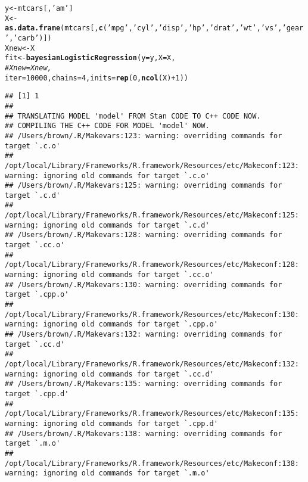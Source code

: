 \documentclass{article}\usepackage[]{graphicx}\usepackage[]{color}
\makeatletter
\newcommand{\hlnum}[1]{\textcolor[rgb]{0.686,0.059,0.569}{#1}}%
\newcommand{\hlstr}[1]{\textcolor[rgb]{0.192,0.494,0.8}{#1}}%
\newcommand{\hlcom}[1]{\textcolor[rgb]{0.678,0.584,0.686}{\textit{#1}}}%
\newcommand{\hlopt}[1]{\textcolor[rgb]{0,0,0}{#1}}%
\newcommand{\hlstd}[1]{\textcolor[rgb]{0.345,0.345,0.345}{#1}}%
\newcommand{\hlkwb}[1]{\textcolor[rgb]{0.69,0.353,0.396}{#1}}%
\newcommand{\hlkwc}[1]{\textcolor[rgb]{0.333,0.667,0.333}{#1}}%
\newcommand{\hlkwd}[1]{\textcolor[rgb]{0.737,0.353,0.396}{\textbf{#1}}}%
\newenvironment{kframe}{%
 \def\at@end@of@kframe{}%
 \ifinner\ifhmode%
  \def\at@end@of@kframe{\end{minipage}}%
  \begin{minipage}{\columnwidth}%
 \fi\fi%
 \def\FrameCommand##1{\hskip\@totalleftmargin \hskip-\fboxsep
 \colorbox{shadecolor}{##1}\hskip-\fboxsep
     \hskip-\linewidth \hskip-\@totalleftmargin \hskip\columnwidth}%
 \MakeFramed {\advance\hsize-\width
   \@totalleftmargin\z@ \linewidth\hsize
   \@setminipage}}%
 {\par\unskip\endMakeFramed%
 \at@end@of@kframe}
\newenvironment{knitrout}{}{} %
\makeatother
\begin{document}
\begin{knitrout}
\color{fgcolor}\begin{kframe}
\begin{alltt}
\hlstd{y} \hlkwb{<-} \hlstd{mtcars[,}\hlstr{'am'}\hlstd{]}
\hlstd{X} \hlkwb{<-} \hlkwd{as.data.frame}\hlstd{(mtcars[,}\hlkwd{c}\hlstd{(}\hlstr{'mpg'}\hlstd{,} \hlstr{'cyl'}\hlstd{,} \hlstr{'disp'}\hlstd{,} \hlstr{'hp'}\hlstd{,} \hlstr{'drat'}\hlstd{,} \hlstr{'wt'}\hlstd{,} \hlstr{'vs'}\hlstd{,} \hlstr{'gear'}\hlstd{,} \hlstr{'carb'}\hlstd{)])}
\hlstd{Xnew} \hlkwb{<-} \hlstd{X}
\hlstd{fit} \hlkwb{<-} \hlkwd{bayesianLogisticRegression}\hlstd{(}\hlkwc{y}\hlstd{=y,} \hlkwc{X}\hlstd{=X,}
                                  \hlcom{# Xnew=Xnew,}
                                  \hlkwc{iter}\hlstd{=}\hlnum{10000}\hlstd{,} \hlkwc{chains}\hlstd{=}\hlnum{4}\hlstd{,} \hlkwc{inits}\hlstd{=}\hlkwd{rep}\hlstd{(}\hlnum{0}\hlstd{,}\hlkwd{ncol}\hlstd{(X)}\hlopt{+}\hlnum{1}\hlstd{))}
\end{alltt}
\begin{verbatim}
## [1] 1
## 
## TRANSLATING MODEL 'model' FROM Stan CODE TO C++ CODE NOW.
## COMPILING THE C++ CODE FOR MODEL 'model' NOW.
## /Users/brown/.R/Makevars:123: warning: overriding commands for target `.c.o'
## /opt/local/Library/Frameworks/R.framework/Resources/etc/Makeconf:123: warning: ignoring old commands for target `.c.o'
## /Users/brown/.R/Makevars:125: warning: overriding commands for target `.c.d'
## /opt/local/Library/Frameworks/R.framework/Resources/etc/Makeconf:125: warning: ignoring old commands for target `.c.d'
## /Users/brown/.R/Makevars:128: warning: overriding commands for target `.cc.o'
## /opt/local/Library/Frameworks/R.framework/Resources/etc/Makeconf:128: warning: ignoring old commands for target `.cc.o'
## /Users/brown/.R/Makevars:130: warning: overriding commands for target `.cpp.o'
## /opt/local/Library/Frameworks/R.framework/Resources/etc/Makeconf:130: warning: ignoring old commands for target `.cpp.o'
## /Users/brown/.R/Makevars:132: warning: overriding commands for target `.cc.d'
## /opt/local/Library/Frameworks/R.framework/Resources/etc/Makeconf:132: warning: ignoring old commands for target `.cc.d'
## /Users/brown/.R/Makevars:135: warning: overriding commands for target `.cpp.d'
## /opt/local/Library/Frameworks/R.framework/Resources/etc/Makeconf:135: warning: ignoring old commands for target `.cpp.d'
## /Users/brown/.R/Makevars:138: warning: overriding commands for target `.m.o'
## /opt/local/Library/Frameworks/R.framework/Resources/etc/Makeconf:138: warning: ignoring old commands for target `.m.o'

\end{verbatim}
\end{kframe}
\end{knitrout}
\end{document}
